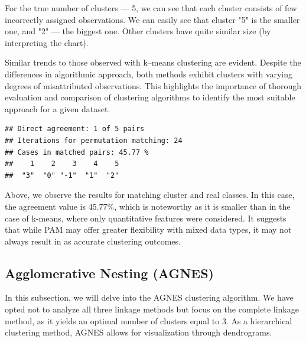 \documentclass[11pt,a4paper]{article}\usepackage[]{graphicx}\usepackage[]{xcolor}
\makeatletter
\newenvironment{kframe}{%
 \def\at@end@of@kframe{}%
 \ifinner\ifhmode%
  \def\at@end@of@kframe{\end{minipage}}%
  \begin{minipage}{\columnwidth}%
 \fi\fi%
 \def\FrameCommand##1{\hskip\@totalleftmargin \hskip-\fboxsep
 \colorbox{shadecolor}{##1}\hskip-\fboxsep
     \hskip-\linewidth \hskip-\@totalleftmargin \hskip\columnwidth}%
 \MakeFramed {\advance\hsize-\width
   \@totalleftmargin\z@ \linewidth\hsize
   \@setminipage}}%
 {\par\unskip\endMakeFramed%
 \at@end@of@kframe}
\newenvironment{knitrout}{}{} %
\makeatother
\begin{document}
	For the true number of clusters --- 5, we can see that each cluster consists of few incorrectly assigned observations. We can easily see that cluster "5" is the smaller one, and "2" --- the biggest one. Other clusters have quite similar size (by interpreting the chart).
	
	Similar trends to those observed with k--means clustering are evident. Despite the differences in algorithmic approach, both methods exhibit clusters with varying degrees of misattributed observations. This highlights the importance of thorough evaluation and comparison of clustering algorithms to identify the most suitable approach for a given dataset.
	
\begin{knitrout}
\color{fgcolor}\begin{kframe}
\begin{verbatim}
## Direct agreement: 1 of 5 pairs
## Iterations for permutation matching: 24 
## Cases in matched pairs: 45.77 %
##    1    2    3    4    5 
##  "3"  "0" "-1"  "1"  "2"
\end{verbatim}
\end{kframe}
\end{knitrout}
	
	Above, we observe the results for matching cluster and real classes. In this case, the agreement value is 45.77\%, which is noteworthy as it is smaller than in the case of k-means, where only quantitative features were considered. It suggests that while PAM may offer greater flexibility with mixed data types, it may not always result in as accurate clustering outcomes. 
	
	\subsection{Agglomerative Nesting (AGNES)}
In this subsection, we will delve into the AGNES clustering algorithm. We have opted not to analyze all three linkage methods but focus on the complete linkage method, as it yields an optimal number of clusters equal to 3. As a hierarchical clustering method, AGNES allows for visualization through dendrograms.
	
\end{document}
